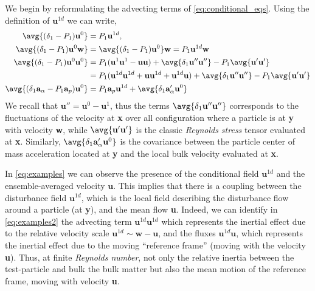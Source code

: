 We begin by reformulating the advecting terms of \ref{eq:conditional_eqs}.
Using the definition of $\textbf{u}^{1d}$ we can write, 
\begin{align}
    \label{eq:examples1}
    \avg{(\delta_1 - P_1) \textbf{u}^0}
    &= P_1 \textbf{u}^{1d},\\ 
    \avg{(\delta_1 - P_1)\textbf{u}^0 \textbf{w}}
    &= \avg{(\delta_1 - P_1)\textbf{u}^0 }\textbf{w} 
    = P_1\textbf{u}^{1d}\textbf{w} \\
    \label{eq:examples2}
    \avg{(\delta_1 - P_1)\textbf{u}^0 \textbf{u}^0}
    &= 
    P_1 (\textbf{u}^1\textbf{u}^1 - \textbf{u}\textbf{u})
    + \avg{\delta_1 \textbf{u}''\textbf{u}''}
    - P_1 \avg{ \textbf{u}'\textbf{u}'}
    \nonumber\\
    &= 
    P_1 (\textbf{u}^{1d}\textbf{u}^{1d} + \textbf{u}\textbf{u}^{1d}+  \textbf{u}^{1d}\textbf{u})
    + \avg{\delta_1 \textbf{u}''\textbf{u}''}
    - P_1 \avg{ \textbf{u}'\textbf{u}'}
    \\
    \avg{(\delta_1\textbf{a}_\alpha - P_1\textbf{a}_p) \textbf{u}^0}
    &=
    P_1\textbf{a}_p \textbf{u}^{1d}
    + \avg{\delta_1\textbf{a}_\alpha' \textbf{u}^0} 
    \label{eq:examples}
\end{align}
We recall that $\textbf{u}'' = \textbf{u}^0 - \textbf{u}^1$, thus the terms $\avg{\delta_1 \textbf{u}''\textbf{u}''}$ corresponds to the fluctuations of the velocity at \textbf{x} over all configuration where a particle is at \textbf{y} with velocity \textbf{w}, while $\avg{ \textbf{u}'\textbf{u}'}$ is the classic \textit{Reynolds stress} tensor evaluated at \textbf{x}. 
Similarly, $\avg{\delta_1\textbf{a}_\alpha' \textbf{u}^0}$ is the covariance between the particle center of mass acceleration located at \textbf{y} and the local bulk velocity evaluated at \textbf{x}. 



In \ref{eq:examples} we can observe the presence of the conditional field $\textbf{u}^{1d}$ and the ensemble-averaged velocity $\textbf{u}$. 
This implies that there is a coupling between the disturbance field $\textbf{u}^{1d}$, which is the local field describing the disturbance flow around a particle (at \textbf{y}), and the mean flow \textbf{u}.
Indeed, we can identify in \ref{eq:examples2} the advecting term $\textbf{u}^{1d}\textbf{u}^{1d}$ which represents the inertial effect due to the relative velocity scale $\textbf{u}^{1d} \sim \textbf{w}- \textbf{u}$, and the fluxes $\textbf{u}^{1d}\textbf{u}$, which represents the inertial effect due to the moving ``reference frame'' (moving with the velocity \textbf{u}). 
Thus, at finite \textit{Reynolds number}, not only the relative inertia between the test-particle and bulk the bulk matter but also the mean motion of the reference frame, moving with velocity \textbf{u}. 



